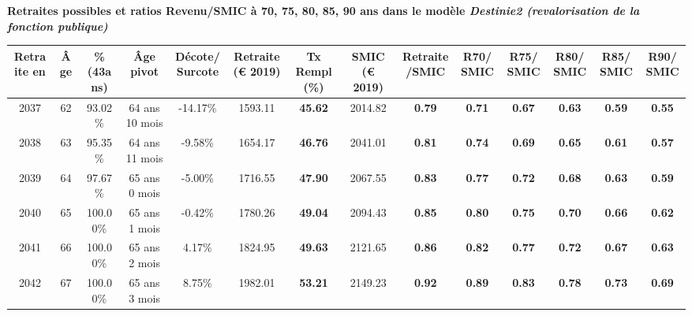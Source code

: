 \vspace{0.1cm} 
{\bf \noindent Retraites possibles et ratios Revenu/SMIC à 70, 75, 80, 85, 90 ans dans le modèle \emph{Destinie2 (revalorisation de la fonction publique)}}  
 
\begin{adjustbox}{max width=\textwidth} 
\begin{tabular}[htb]{|c|c||c|c|c||c|c||c|c||c|c|c|c|c|} 
\hline 
 Retraite en &  Âge &  \%(43ans) &  Âge pivot &  Décote/Surcote &  Retraite (\euro{} 2019) &  Tx Rempl(\%) &  SMIC (\euro{} 2019) &  Retraite/SMIC &  R70/SMIC &  R75/SMIC &  R80/SMIC &  R85/SMIC &  R90/SMIC \\ 
\hline \hline 
 2037 &  62 &  93.02\% &  64 ans 10 mois &  -14.17\% &  1593.11 &  {\bf 45.62} &  2014.82 &  {\bf {\color{red} 0.79}} &  {\bf {\color{red} 0.71}} &  {\bf {\color{red} 0.67}} &  {\bf {\color{red} 0.63}} &  {\bf {\color{red} 0.59}} &  {\bf {\color{red} 0.55}} \\ 
\hline 
 2038 &  63 &  95.35\% &  64 ans 11 mois &  -9.58\% &  1654.17 &  {\bf 46.76} &  2041.01 &  {\bf {\color{red} 0.81}} &  {\bf {\color{red} 0.74}} &  {\bf {\color{red} 0.69}} &  {\bf {\color{red} 0.65}} &  {\bf {\color{red} 0.61}} &  {\bf {\color{red} 0.57}} \\ 
\hline 
 2039 &  64 &  97.67\% &  65 ans 0 mois &  -5.00\% &  1716.55 &  {\bf 47.90} &  2067.55 &  {\bf {\color{red} 0.83}} &  {\bf {\color{red} 0.77}} &  {\bf {\color{red} 0.72}} &  {\bf {\color{red} 0.68}} &  {\bf {\color{red} 0.63}} &  {\bf {\color{red} 0.59}} \\ 
\hline 
 2040 &  65 &  100.00\% &  65 ans 1 mois &  -0.42\% &  1780.26 &  {\bf 49.04} &  2094.43 &  {\bf {\color{red} 0.85}} &  {\bf {\color{red} 0.80}} &  {\bf {\color{red} 0.75}} &  {\bf {\color{red} 0.70}} &  {\bf {\color{red} 0.66}} &  {\bf {\color{red} 0.62}} \\ 
\hline 
 2041 &  66 &  100.00\% &  65 ans 2 mois &  4.17\% &  1824.95 &  {\bf 49.63} &  2121.65 &  {\bf {\color{red} 0.86}} &  {\bf {\color{red} 0.82}} &  {\bf {\color{red} 0.77}} &  {\bf {\color{red} 0.72}} &  {\bf {\color{red} 0.67}} &  {\bf {\color{red} 0.63}} \\ 
\hline 
 2042 &  67 &  100.00\% &  65 ans 3 mois &  8.75\% &  1982.01 &  {\bf 53.21} &  2149.23 &  {\bf {\color{red} 0.92}} &  {\bf {\color{red} 0.89}} &  {\bf {\color{red} 0.83}} &  {\bf {\color{red} 0.78}} &  {\bf {\color{red} 0.73}} &  {\bf {\color{red} 0.69}} \\ 
\hline 
\hline 
\end{tabular} 
\end{adjustbox} 
 
